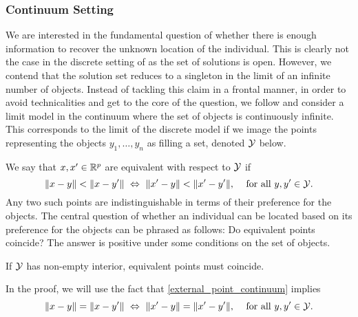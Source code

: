 \documentclass[twoside, 11pt]{article}
\begin{document}
\subsubsection{Continuum Setting}
\label{sec:external point continuum}
We are interested in the fundamental question of whether there is enough information to recover the unknown location of the individual. This is clearly not the case in the discrete setting of  as the set of solutions is open. However, we contend that the solution set reduces to a singleton in the limit of an infinite number of objects. Instead of tackling this claim in a frontal manner, in order to avoid technicalities and get to the core of the question, we follow \citet{shepard1966metric} and consider a limit model in the continuum where the set of objects is continuously infinite. 
This corresponds to the limit of the discrete model if we image the points representing the objects $y_1, \dots, y_n$ as filling a set, denoted $\mathcal{Y}$ below. 

We say that $x, x' \in \mathbb{R}^p$ are equivalent with respect to $\mathcal{Y}$ if  
\begin{equation}
\label{external_point_continuum}
\text{$\|x-y\| < \|x-y'\| \ \Leftrightarrow \  \|x'-y\| < \|x'-y'\|$, \quad for all $y, y' \in \mathcal{Y}$.}
\end{equation}
Any two such points are indistinguishable in terms of their preference for the objects.
The central question of whether an individual can be located based on its preference for the objects can be phrased as follows: Do equivalent points coincide? The answer is positive under some conditions on the set of objects.

\begin{theorem}
\label{thm:external_point}
If $\mathcal{Y}$ has non-empty interior, equivalent points must coincide. 
\end{theorem}

In the proof, we will use the fact that \eqref{external_point_continuum} implies
\begin{equation}
\label{external_point_continuum_equal}
\text{$\|x-y\| = \|x-y'\| \ \Leftrightarrow \  \|x'-y\| = \|x'-y'\|$, \quad for all $y, y' \in \mathcal{Y}$.}
\end{equation}
\end{document}
